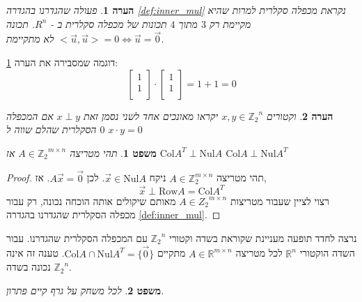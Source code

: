 \documentclass[12pt,leqno]{article}
\theoremstyle{theoremdd}
\newtheorem{theorem}{משפט}
\newtheorem{comm}{הערה}
\newcommand{\Zn}{{\mathbb{Z}_2}^n}
\newcommand{\Col}{\mathrm{Col}}
\newcommand{\Nul}{\mathrm{Nul}}
\begin{document}
\begin{comm}
    \label{comm:not_really_inner_mul}
    פעולה שהגדרנו 
    בהגדרה 
    \ref{def:inner_mul}
    נקראת 
    מכפלה סקלרית
    למרות שהיא
    מקיימת רק 
    $3$
    מתוך 
    $4$
    תכונות של מכפלה סקלרית ב
    -
    $R^n$.   
    תכונה 
    $<\vec{u},\vec{u}> = 0 \Leftrightarrow \vec{u} = \vec{0} $
    לא מתקיימת.
\end{comm}
דוגמה 
שמסבירה את הערה
\ref{comm:not_really_inner_mul}:
\[
    \begin{bmatrix}
    1 \\
    1 \\
    \end{bmatrix}    
    \cdot 
    \begin{bmatrix}
    1 \\
    1 \\
    \end{bmatrix} 
    = 1 + 1 = 0
\]
\begin{comm}
    וקטורים 
    $x, y \in \Zn $
    יקראו מאונכים אחד לשני נסמן זאת 
    $x \perp  y$
    אם המכפלה הסקלרית שהלם שווה 
    ל
    $0$
    $x \cdot y = 0$
\end{comm}
\begin{theorem}
    \label{the: Nul A and Col AT}
    תהי מטריצה 
    $A \in {\mathbb{Z}_2}^{m \times n }$
    אז 
    $\Col A^T \perp \Nul A$
    $\Col A \perp \Nul A^T$
\end{theorem}
\begin{proof}
    תהי 
    מטריצה
    $A \in \mathbb{Z}_2^{m \times n}$
    ניקח 
    $\vec x \in \mathrm{Nul} A$.
    לכן
    $A\vec x=\vec 0$. 
    אז,
    \[
        \vec x \perp \mathrm{Row}A=\mathrm{Col} A^T
    \]
    רצוי לציין 
    שעבור 
    מטריצות 
    $A \in {Z_2}^{m \times n}$
    מאותם שיקולים אותה הוכחה נכונה,
    רק עבור מכפלה הסקלרית שהגדרנו 
    בהגדרה 
    \ref{def:inner_mul}.
\end{proof}
נרצה לחדד תופעה מעניינת שקוראת בשדה וקטורי 
$\Zn$
עם המכפלה הסקלרית שהגדרנו.
עבור השדה הוקטורי 
$\mathbb{R}^n$
לכל מטריצה 
$A \in \mathbb{R}^{m \times n}$
מתקיים 
$\Col A \cap \Nul A^T = \{ \vec{0}\}$.
טענה זה אינה נכונה בשדה 
$\Zn$.
\begin{theorem}
    \label{thrm: clean game has solution}
    לכל משחק על גרף קיים פתרון.
\end{theorem}
\end{document}
